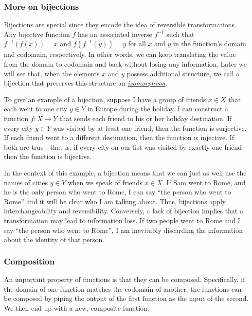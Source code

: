 \documentclass[
]{book}
\theoremstyle{definition}
\theoremstyle{definition}
\theoremstyle{definition}
\theoremstyle{definition}
\theoremstyle{remark}
\begin{document}
\subsubsection{More on bijections}\label{bijections}

Bijections are special since they encode the idea of reversible transformations. Any bijective function \(f\) has an associated inverse \(f^{-1}\) such that \(f^{-1}(f(x)) = x\) and \(f(f^{-1}(y)) = y\) for all \(x\) and \(y\) in the function's domain and codomain, respectively. In other words, we can keep translating the value from the domain to codomain and back without losing any information. Later we will see that, when the elements \(x\) and \(y\) possess additional structure, we call a bijection that preserves this structure an \hyperref[isomorphism]{\emph{isomorphism}}.

To give an example of a bijection, suppose I have a group of friends \(x \in X\) that each went to one city \(y \in Y\) in Europe during the holiday. I can construct a function \(f: X \to Y\) that sends each friend to his or her holiday destination. If every city \(y \in Y\) was visited by at least one friend, then the function is surjective. If each friend went to a different destination, then the function is injective. If both are true - that is, if every city on our list was visited by exactly one friend - then the function is bijective.

In the context of this example, a bijection means that we can just as well use the names of cities \(y \in Y\) when we speak of friends \(x \in X\). If Sam went to Rome, and he is the only person who went to Rome, I can say ``the person who went to Rome'' and it will be clear who I am talking about. Thus, bijections apply interchangeability and reversibility. Conversely, a lack of bijection implies that a transformation may lead to information loss. If two people went to Rome and I say ``the person who went to Rome'', I am inevitably discarding the information about the identity of that person.

\subsubsection{Composition}\label{composition}

An important property of functions is that they can be composed. Specifically, if the domain of one function matches the codomain of another, the functions can be composed by piping the output of the first function as the input of the second. We then end up with a new, composite function:
\end{document}
